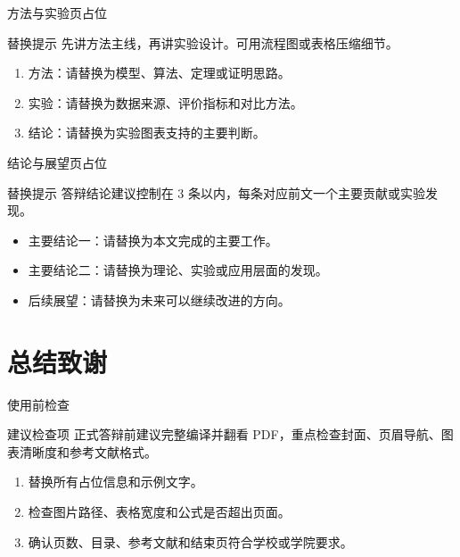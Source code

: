 \documentclass[12pt,aspectratio=43]{beamer}
\newcommand{\JLUSectionTitleSix}{总结致谢}
\begin{document}
\begin{frame}{方法与实验页占位}
  \begin{block}{替换提示}
    先讲方法主线，再讲实验设计。可用流程图或表格压缩细节。
  \end{block}

  \begin{enumerate}
    \item 方法：请替换为模型、算法、定理或证明思路。
    \item 实验：请替换为数据来源、评价指标和对比方法。
    \item 结论：请替换为实验图表支持的主要判断。
  \end{enumerate}
\end{frame}

\begin{frame}{结论与展望页占位}
  \begin{block}{替换提示}
    答辩结论建议控制在 3 条以内，每条对应前文一个主要贡献或实验发现。
  \end{block}

  \begin{itemize}
    \item 主要结论一：请替换为本文完成的主要工作。
    \item 主要结论二：请替换为理论、实验或应用层面的发现。
    \item 后续展望：请替换为未来可以继续改进的方向。
  \end{itemize}
\end{frame}

\section{\JLUSectionTitleSix}

\begin{frame}{使用前检查}
  \begin{block}{建议检查项}
    正式答辩前建议完整编译并翻看 PDF，重点检查封面、页眉导航、图表清晰度和参考文献格式。
  \end{block}

  \begin{enumerate}
    \item 替换所有占位信息和示例文字。
    \item 检查图片路径、表格宽度和公式是否超出页面。
    \item 确认页数、目录、参考文献和结束页符合学校或学院要求。
  \end{enumerate}
\end{frame}
\end{document}
